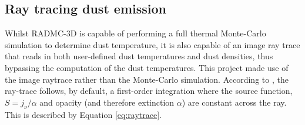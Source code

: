 \documentclass{report}
\begin{document}

\subsection{Ray tracing dust emission} \label{sec:rt_des}
Whilst RADMC-3D is capable of performing a full thermal Monte-Carlo simulation to determine dust temperature, it is also capable of an image ray trace that reads in both user-defined dust temperatures and dust densities, thus bypassing the computation of the dust temperatures. This project made use of the image raytrace rather than the Monte-Carlo simulation. According to \textcite{manual}, the ray-trace follows, by default, a first-order integration where the source function, $S = j_{\nu}/\alpha$ and opacity (and therefore extinction $\alpha$) are constant across the ray. This is described by Equation \ref{eq:raytrace}.
\end{document}
